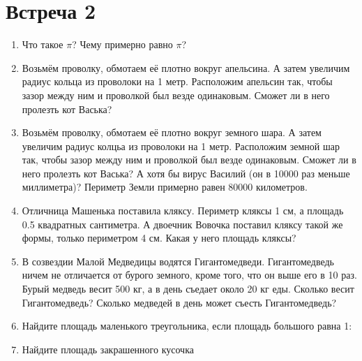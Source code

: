 \documentclass[a4paper, 12pt]{article}
\begin{document}
\newpage
\section{Встреча 2}

\begin{enumerate}

  \item Что такое $\pi$? Чему примерно равно $\pi$?

  \item Возьмём проволку, обмотаем её плотно вокруг апельсина. А затем увеличим радиус кольца из проволоки на 1 метр. Расположим апельсин так, чтобы зазор между ним и проволкой был везде одинаковым. Сможет ли в него пролезть кот Васька?

  \item Возьмём проволку, обмотаем её плотно вокруг земного шара. А затем увеличим радиус колцьа из проволоки на 1 метр. Расположим земной шар так, чтобы зазор между ним и проволкой был везде одинаковым. Сможет ли в него пролезть кот Васька? А хотя бы вирус Василий (он в 10000 раз меньше миллиметра)? Периметр Земли примерно равен 80000 километров.

  \item Отличница Машенька поставила кляксу. Периметр кляксы 1 см, а площадь 0.5 квадратных сантиметра. А двоечник Вовочка поставил кляксу такой же формы, только периметром 4 см. Какая у него площадь кляксы?

  \item В созвездии Малой Медведицы водятся Гигантомедведи. Гигантомедведь ничем не отличается от бурого земного, кроме того, что он выше его в 10 раз. Бурый медведь весит 500 кг, а в день съедает около 20 кг еды. Сколько весит Гигантомедведь? Сколько медведей в день может съесть Гигантомедведь?

  \item Найдите площадь маленького треугольника, если площадь большого равна 1:
    
    \vspace{5cm}



  \item Найдите площадь закрашенного кусочка 




\end{enumerate}
\end{document}
